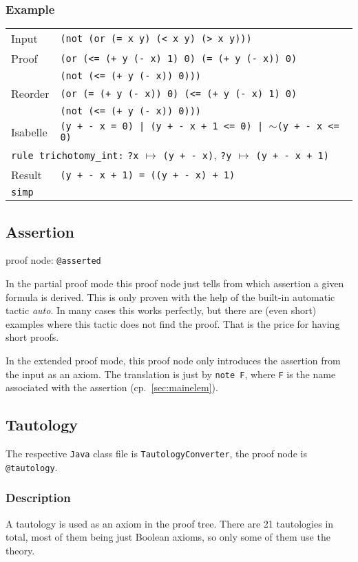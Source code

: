 \documentclass[10pt,a4paper]{article}
\newcommand{\jav}{\texttt{Java}\xspace}
\newcommand{\ttt}{\texttt}
\newcommand{\negat}{\ensuremath{\sim}}
\newcommand{\nega}{\negat\xspace}
\newcommand{\pat}[2]{\ttt{?#1} $\mapsto$ \ttt{#2}}
\def\ind{\quad}
\newcommand{\exl}[2]{\exlm{#1}{\ttt{#2}}}
\newcommand{\exlm}[2]{#1 & #2 \\[1mm]}
\newcommand{\exmc}[2]{\multicolumn{2}{l}{\ttt{#1} #2} \\[1mm]}
\newcommand{\exmcf}[1]{\multicolumn{2}{l}{\ttt{#1}}}
\begin{document}
\subsubsection*{Example}
\begin{tabular}{ll}
	\exl{Input}{(not (or (= x y) (< x y) (> x y)))}
	\exlm{Proof}{\ttt{(or (<= (+ y (- x) 1) 0) (= (+ y (- x)) 0)} \\ & \ind \ttt{(not (<= (+ y (- x)) 0)))}}
	\exlm{Reorder}{\ttt{(or (= (+ y (- x)) 0) (<= (+ y (- x) 1) 0)} \\ & \ind \ttt{(not (<= (+ y (- x)) 0)))}}
	\exl{Isabelle}{(y + - x = 0) | (y + - x + 1 <= 0) | \nega(y + - x <= 0)}
	\exmc{rule trichotomy\_int:}{\pat{x}{(y + - x)}, \pat{y}{(y + - x + 1)}}
	\exl{Result}{(y + - x + 1) = ((y + - x) + 1)}
	\exmcf{\ttt{simp}}
\end{tabular}
%
\subsection{Assertion}\label{sec:assert}
proof node: \ttt{@asserted}

\medskip

In the partial proof mode this proof node just tells from which assertion a given formula is derived. This is only proven with the help of the built-in automatic tactic \emph{auto}. In many cases this works perfectly, but there are (even short) examples where this tactic does not find the proof. That is the price for having short proofs.

In the extended proof mode, this proof node only introduces the assertion from the input as an axiom. The translation is just by \ttt{note F}, where \ttt{F} is the name associated with the assertion (cp.~\ref{sec:mainelem}).
%
\subsection{Tautology}\label{sec:taut}
The respective \jav class file is \ttt{TautologyConverter}, the proof node is \ttt{@tautology}.
%
\subsubsection*{Description}
A tautology is used as an axiom in the proof tree. There are 21 tautologies in total, most of them being just Boolean axioms, so only some of them use the theory.
\end{document}
